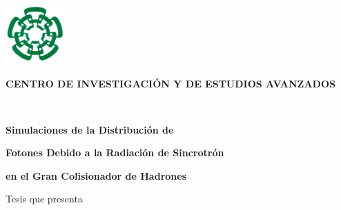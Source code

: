 \documentclass[12pt,letterpaper,spanish,openrigth,twoside]{book}%
\newcommand{\bs}{\bigskip}
\begin{document}
\renewcommand{\thepage}{\roman{page}}
\hspace{-2.9cm}
\begin{minipage}{2.3cm}\vspace{-6.0 cm}
\includegraphics [width=2.3cm,height=2.3cm]{logo.pdf}
\end{minipage}
\begin{center}
\vspace{-4.6cm} \begin{large}
{\bf \hspace{-1.2cm}\textsf{CENTRO DE INVESTIGACIÓN Y DE ESTUDIOS AVANZADOS}}\\   \end{large}
\\ 
\end{center}

\bs\bs\bs\bs
\begin{center}
 {\large \bf \bs \bf \hspace{-2.8cm}\textsf{Simulaciones de la Distribución de} }
\end{center}
\begin{center}
 {\large \bf \bs \bf \hspace{-2.8cm}\textsf{Fotones Debido a la Radiación de Sincrotrón} }
\end{center}
\begin{center} {\large \bf \bs \bf \hspace{-2.8cm}\textsf{en el Gran Colisionador de Hadrones}}
\end{center}\bs\bs\bs 
 \begin{center}
{\large \hspace{-2.8cm}\textsf{Tesis que presenta}}
\end{center}\bs
\end{document}

